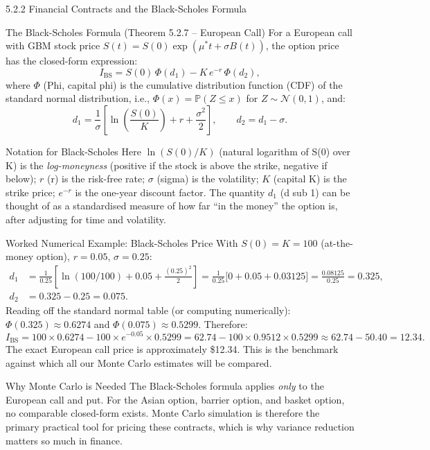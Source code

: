 \documentclass[aspectratio=169,10pt]{beamer}
\begin{document}
\begin{frame}[allowframebreaks]{5.2.2 Financial Contracts and the Black-Scholes Formula}
\framebreak

\begin{block}{The Black-Scholes Formula (Theorem 5.2.7 -- European Call)}
  For a European call with GBM stock price $S(t) = S(0)\exp(\mu^* t + \sigma B(t))$,
  the option price has the closed-form expression:
  \[
    I_{\mathrm{BS}} = S(0)\,\Phi(d_1) - K\,e^{-r}\,\Phi(d_2),
  \]
  where $\Phi$ (Phi, capital phi) is the cumulative distribution function (CDF)
  of the standard normal distribution, i.e., $\Phi(x) = \mathbb{P}(Z \le x)$
  for $Z \sim \mathcal{N}(0,1)$, and:
  \[
    d_1 = \frac{1}{\sigma}\!\left[\ln\!\left(\frac{S(0)}{K}\right) + r + \frac{\sigma^2}{2}\right],
    \qquad
    d_2 = d_1 - \sigma.
  \]
\end{block}

\begin{block}{Notation for Black-Scholes}
  Here $\ln(S(0)/K)$ (natural logarithm of S(0) over K) is the
  \emph{log-moneyness} (positive if the stock is above the strike, negative
  if below); $r$ (r) is the risk-free rate; $\sigma$ (sigma) is the
  volatility; $K$ (capital K) is the strike price; $e^{-r}$ is the
  one-year discount factor.
  The quantity $d_1$ (d sub 1) can be thought of as a standardised measure
  of how far ``in the money'' the option is, after adjusting for time and
  volatility.
\end{block}

\framebreak

\begin{exampleblock}{Worked Numerical Example: Black-Scholes Price}
  With $S(0) = K = 100$ (at-the-money option), $r = 0.05$, $\sigma = 0.25$:
  \begin{align*}
    d_1 &= \frac{1}{0.25}\!\left[\ln(100/100) + 0.05 + \frac{(0.25)^2}{2}\right]
        = \frac{1}{0.25}\bigl[0 + 0.05 + 0.03125\bigr]
        = \frac{0.08125}{0.25} = 0.325,\\
    d_2 &= 0.325 - 0.25 = 0.075.
  \end{align*}
  Reading off the standard normal table (or computing numerically):
  $\Phi(0.325) \approx 0.6274$ and $\Phi(0.075) \approx 0.5299$.
  Therefore:
  \[
    I_{\mathrm{BS}} = 100 \times 0.6274 - 100 \times e^{-0.05} \times 0.5299
    = 62.74 - 100 \times 0.9512 \times 0.5299
    \approx 62.74 - 50.40 = 12.34.
  \]
  The exact European call price is approximately \$12.34.  This is the benchmark
  against which all our Monte Carlo estimates will be compared.
\end{exampleblock}

\begin{alertblock}{Why Monte Carlo is Needed}
  The Black-Scholes formula applies \emph{only} to the European call and put.
  For the Asian option, barrier option, and basket option, no comparable
  closed-form exists.  Monte Carlo simulation is therefore the primary practical
  tool for pricing these contracts, which is why variance reduction matters so
  much in finance.
\end{alertblock}

\end{frame}
\end{document}
